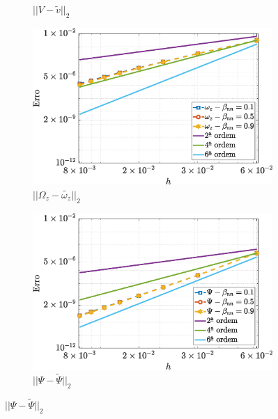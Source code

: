 \begin{figure}[H]
\begin{subfigure}[b]{.47\textwidth}
        \caption{$||V - \widetilde{v}||_{2}$}
        \label{error_v_2nd_Case1_giesekus_alphaG_0.1}
    \end{subfigure}
    \qquad
    \begin{subfigure}[b]{.47\textwidth}
        \includegraphics[width=\textwidth]{figures/Case12/Giesekus/Errors/NormErr_2nd_Re_100_Wi_1_epsilon_0_xi_0_alphaG_0.1_Dt_1e-06_at_0.05_tipsim_1_MMS_12_Wz.eps}
        \caption{$||\Omega_{z} - \widetilde{\omega_{z}}||_{2}$}
        \label{error_wz_2nd_Case1_giesekus_alphaG_0.1}
    \end{subfigure}
    \qquad
    \begin{subfigure}[b]{.47\textwidth}
        \includegraphics[width=\textwidth]{figures/Case12/Giesekus/Errors/NormErr_2nd_Re_100_Wi_1_epsilon_0_xi_0_alphaG_0.1_Dt_1e-06_at_0.05_tipsim_1_MMS_12_Psi.eps}
        \caption{$||\Psi - \widetilde{\Psi}||_{2}$}
        \label{error_psi_2nd_Case1_oldorydbgiesekus_alphaG_0.1}
    \end{subfigure}
    \fautor
\end{figure}

